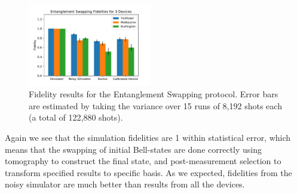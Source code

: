 \begin{figure}[h!]
  \centering
  \includegraphics[width=0.48\textwidth]{images/results/swap_histogram.pdf}
	\caption{Fidelity results for the Entanglement Swapping protocol. Error bars
are estimated by taking the variance over 15 runs of 8,192 shots each (a total
of 122,880 shots).}
	\label{fig:swap_histogram}
\end{figure}

Again we see that the simulation fidelities are 1 within
statistical error, which means that the swapping of initial Bell-states are done
correctly using tomography to construct the final state, and post-measurement
selection to transform specified results to specific basis. As we expected,
fidelities from the noisy simulator are much better than results from all the
devices.

